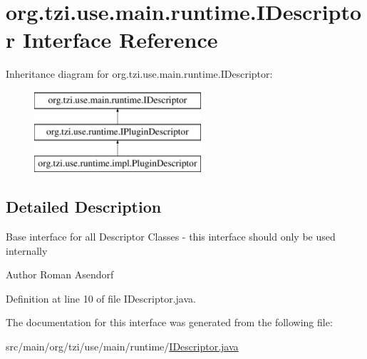 \hypertarget{interfaceorg_1_1tzi_1_1use_1_1main_1_1runtime_1_1_i_descriptor}{\section{org.\-tzi.\-use.\-main.\-runtime.\-I\-Descriptor Interface Reference}
\label{interfaceorg_1_1tzi_1_1use_1_1main_1_1runtime_1_1_i_descriptor}
}
Inheritance diagram for org.\-tzi.\-use.\-main.\-runtime.\-I\-Descriptor\-:\begin{figure}[H]
\begin{center}
\leavevmode
\includegraphics[height=3.000000cm]{interfaceorg_1_1tzi_1_1use_1_1main_1_1runtime_1_1_i_descriptor}
\end{center}
\end{figure}


\subsection{Detailed Description}
Base interface for all Descriptor Classes -\/ this interface should only be used internally

\begin{DoxyAuthor}{Author}
Roman Asendorf 
\end{DoxyAuthor}


Definition at line 10 of file I\-Descriptor.\-java.



The documentation for this interface was generated from the following file\-:\begin{DoxyCompactItemize}
\item 
src/main/org/tzi/use/main/runtime/\hyperlink{_i_descriptor_8java}{I\-Descriptor.\-java}\end{DoxyCompactItemize}
